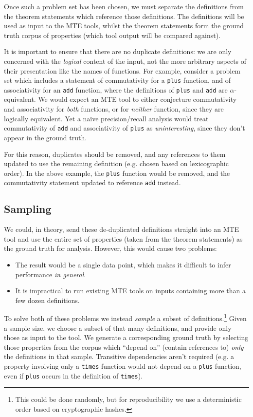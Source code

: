 Once such a problem set has been chosen, we must separate the definitions from
the theorem statements which reference those definitions. The definitions will
be used as input to the MTE tools, whilst the theorem statements form the ground
truth corpus of properties (which tool output will be compared against).

It is important to ensure that there are no duplicate definitions: we are only
concerned with the \emph{logical} content of the input, not the more arbitrary
aspects of their presentation like the names of functions. For example, consider
a problem set which includes a statement of commutativity for a \texttt{plus}
function, and of associativity for an \texttt{add} function, where the
definitions of \texttt{plus} and \texttt{add} are $\alpha$-equivalent. We would
expect an MTE tool to either conjecture commutativity and associativity for
\emph{both} functions, or for \emph{neither} function, since they are logically
equivalent. Yet a na\"ive precision/recall analysis would treat commutativity of
\texttt{add} and associativity of \texttt{plus} as \emph{uninteresting}, since
they don't appear in the ground truth.

For this reason, duplicates should be removed, and any references to them
updated to use the remaining definition (e.g. chosen based on lexicographic
order). In the above example, the \texttt{plus} function would be removed, and
the commutativity statement updated to reference \texttt{add} instead.

\subsection{Sampling}
\label{section:sampling}

We could, in theory, send these de-duplicated definitions straight into an MTE
tool and use the entire set of properties (taken from the theorem statements) as
the ground truth for analysis. However, this would cause two problems:

\begin{itemize}
\item The result would be a single data point, which makes it difficult to
  infer performance \emph{in general}.
\item It is impractical to run existing MTE tools on inputs containing more
  than a few dozen definitions.
\end{itemize}

To solve both of these problems we instead \emph{sample} a subset of
definitions.\footnote{This could be done randomly, but for reproducibility we
  use a deterministic order based on cryptographic hashes.} Given a sample size,
we choose a subset of that many definitions, and provide only those as input to
the tool. We generate a corresponding ground truth by selecting those properties
from the corpus which ``depend on'' (contain references to) \emph{only} the
definitions in that sample. Transitive dependencies aren't required (e.g. a
property involving only a \texttt{times} function would not depend on a
\texttt{plus} function, even if \texttt{plus} occurs in the definition of
\texttt{times}).

